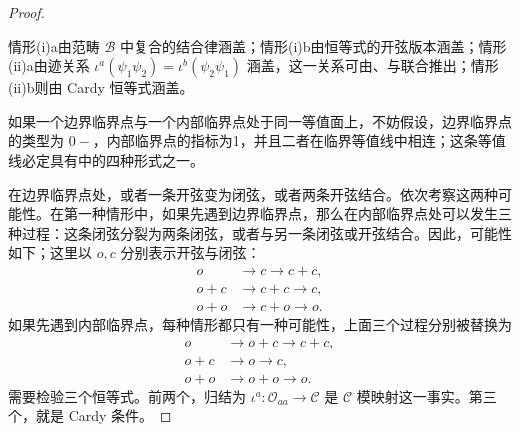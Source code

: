 \begin{proof}
\begin{figure}[H]
\centering
{}
\BookNumberOnlyCaption\label{fig:2.38}
\end{figure}

\begin{figure}[H]
\centering
{}
\BookNumberOnlyCaption\label{fig:2.39}
\end{figure}

情形(i)a由范畴 $\mathcal{B}$ 中复合的结合律涵盖；情形(i)b由恒等式的开弦版本涵盖；情形(ii)a由迹关系 $\iota^a(\psi_1\psi_2)=\iota^b(\psi_2\psi_1)$ 涵盖，这一关系可由、与联合推出；情形(ii)b则由 Cardy 恒等式涵盖。

如果一个边界临界点与一个内部临界点处于同一等值面上，不妨假设，边界临界点的类型为 $0-$，内部临界点的指标为1，并且二者在临界等值线中相连；这条等值线必定具有中的四种形式之一。

\begin{figure}[H]
\centering
{}
\BookNumberOnlyCaption\label{fig:2.40}
\end{figure}

在边界临界点处，或者一条开弦变为闭弦，或者两条开弦结合。依次考察这两种可能性。在第一种情形中，如果先遇到边界临界点，那么在内部临界点处可以发生三种过程：这条闭弦分裂为两条闭弦，或者与另一条闭弦或开弦结合。因此，可能性如下；这里以 $o,c$ 分别表示开弦与闭弦：
\[
\begin{aligned}
o&\longrightarrow c\longrightarrow c+c,\\
o+c&\longrightarrow c+c\longrightarrow c,\\
o+o&\longrightarrow c+o\longrightarrow o.
\end{aligned}
\]
如果先遇到内部临界点，每种情形都只有一种可能性，上面三个过程分别被替换为
\[
\begin{aligned}
o&\longrightarrow o+c\longrightarrow c+c,\\
o+c&\longrightarrow o\longrightarrow c,\\
o+o&\longrightarrow o+o\longrightarrow o.
\end{aligned}
\]
需要检验三个恒等式。前两个，归结为 $\iota^a\colon\mathcal{O}_{aa}\to\mathcal{C}$ 是 $\mathcal{C}$ 模映射这一事实。第三个，就是 Cardy 条件。


\end{proof}
